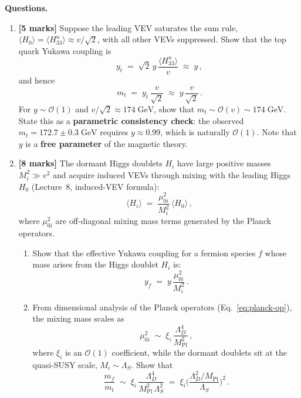 \documentclass[11pt,a4paper]{article}
\begin{document}
\noindent\textbf{Questions.}
\begin{enumerate}[label=(\alph*)]

  \item \textbf{[5 marks]}
    Suppose the leading VEV saturates the sum rule,
    $\langle H_0 \rangle = \langle H_{33}^u \rangle \approx v/\sqrt{2}$,
    with all other VEVs suppressed.  Show that the top quark Yukawa
    coupling is
    \begin{equation}\label{eq:top-yukawa-prob}
      y_t \;=\; \sqrt{2}\,y \,\frac{\langle H_{33}^u \rangle}{v}
      \;\approx\; y\,,
    \end{equation}
    and hence
    \begin{equation}\label{eq:top-mass-prob}
      m_t \;=\; y_t\, \frac{v}{\sqrt{2}} \;\approx\; y\, \frac{v}{\sqrt{2}}\,.
    \end{equation}
    For $y \sim \mathcal{O}(1)$ and $v/\sqrt{2} \approx 174\;\text{GeV}$,
    show that $m_t \sim \mathcal{O}(v) \sim 174\;\text{GeV}$.  State this as
    a \textbf{parametric consistency check}: the observed
    $m_t = 172.7 \pm 0.3\;\text{GeV}$ requires $y \approx 0.99$, which
    is naturally $\mathcal{O}(1)$.  Note that $y$ is a \textbf{free
    parameter} of the magnetic theory.

  \item \textbf{[8 marks]}
    The dormant Higgs doublets $H_i$ have large positive masses
    $M_i^2 \gg v^2$ and acquire induced VEVs through mixing with the
    leading Higgs $H_0$ (Lecture~8, induced-VEV formula):
    \begin{equation}\label{eq:induced-vev-prob}
      \langle H_i \rangle
      \;=\; \frac{\mu_{0i}^2}{M_i^2}\, \langle H_0 \rangle\,,
    \end{equation}
    where $\mu_{0i}^2$ are off-diagonal mixing mass terms generated by
    the Planck operators.
    \begin{enumerate}[label=(\roman*)]
      \item Show that the effective Yukawa coupling for a fermion species
        $f$ whose mass arises from the Higgs doublet $H_i$ is:
        \begin{equation}\label{eq:eff-yukawa-dormant}
          y_f \;=\; y\, \frac{\mu_{0i}^2}{M_i^2}\,.
        \end{equation}

      \item From dimensional analysis of the Planck operators
        (Eq.~\eqref{eq:planck-op}), the mixing mass scales as
        \[
          \mu_{0i}^2 \;\sim\; \xi_i\, \frac{\Lambda_D^4}{M_{\text{Pl}}^2}\,,
        \]
        where $\xi_i$ is an $\mathcal{O}(1)$ coefficient, while the
        dormant doublets sit at the quasi-SUSY scale,
        $M_i \sim \Lambda_S$.  Show that
        \begin{equation}\label{eq:mass-ratio-suppression}
          \frac{m_f}{m_t}
          \;\sim\; \xi_i\, \frac{\Lambda_D^4}{M_{\text{Pl}}^2\,\Lambda_S^2}
          \;=\; \xi_i \biggl(\frac{\Lambda_D^2/M_{\text{Pl}}}{\Lambda_S}\biggr)^{\!2}\,.
        \end{equation}


\end{enumerate}
\end{enumerate}
\end{document}
